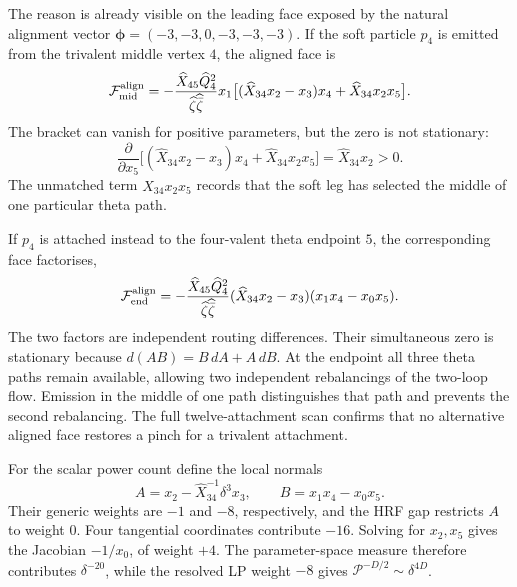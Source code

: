 \documentclass[a4paper,11pt]{article}
\begin{document}
The reason is already visible on the leading face exposed by the natural
alignment vector \(\boldsymbol\phi=(-3,-3,0,-3,-3,-3)\).  If the soft
particle \(p_4\) is emitted from the trivalent middle vertex \(4\), the
aligned face is
\begin{equation}
 \mathcal F_{\rm mid}^{\rm align}
 =-\frac{\widehat X_{45}\widehat Q_4^2}
 {\widehat\zeta\widehat{\bar\zeta}}x_1
 \big[(\widehat X_{34}x_2-x_3)x_4
       +\widehat X_{34}x_2x_5\big].
 \label{eq:five-central-soft-middle-attachment}
\end{equation}
The bracket can vanish for positive parameters, but the zero is not
stationary:
\begin{equation}
 \frac{\partial}{\partial x_5}
 \big[(\widehat X_{34}x_2-x_3)x_4
       +\widehat X_{34}x_2x_5\big]
 =\widehat X_{34}x_2>0.
 \label{eq:five-central-soft-middle-derivative}
\end{equation}
The unmatched term \(\widehat X_{34}x_2x_5\) records that the soft leg has selected the
middle of one particular theta path.

If \(p_4\) is attached instead to the four-valent theta endpoint \(5\), the
corresponding face factorises,
\begin{equation}
 \mathcal F_{\rm end}^{\rm align}
 =-\frac{\widehat X_{45}\widehat Q_4^2}
 {\widehat\zeta\widehat{\bar\zeta}}
 (\widehat X_{34}x_2-x_3)(x_1x_4-x_0x_5).
 \label{eq:five-central-soft-end-attachment}
\end{equation}
The two factors are independent routing differences.  Their simultaneous
zero is stationary because \(d(AB)=B\,dA+A\,dB\).  At the endpoint all
three theta paths remain available, allowing two independent
rebalancings of the two-loop flow.  Emission in the middle of one path
distinguishes that path and prevents the second rebalancing.  The full
twelve-attachment scan confirms that no alternative aligned face restores
a pinch for a trivalent attachment.

For the scalar power count define the local normals
\begin{equation}
 A=x_2-\widehat X_{34}^{-1}\delta^3x_3,
 \qquad B=x_1x_4-x_0x_5.
 \label{eq:five-central-soft-local-normals}
\end{equation}
Their generic weights are \(-1\) and \(-8\), respectively, and the HRF gap
restricts \(A\) to weight \(0\).  Four tangential coordinates contribute
\(-16\).  Solving for \(x_2,x_5\) gives the Jacobian
\(-1/x_0\), of weight \(+4\).  The parameter-space measure therefore
contributes \(\delta^{-20}\), while the resolved LP weight \(-8\) gives
\(\mathcal P^{-D/2}\sim\delta^{4D}\).
\end{document}
